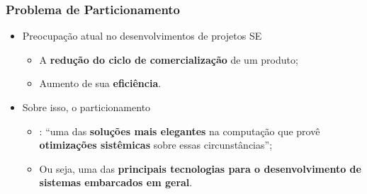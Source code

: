       \begin{frame} \vspace{-1em}
         \frametitle{Problema de Particionamento}
         \begin{itemize} \setlength{\itemsep}{1.6em}
            \item Preocupação atual no desenvolvimentos de projetos SE
            \begin{itemize} \setlength{\itemsep}{1.2em}
               \item A \textbf{redução do ciclo de comercialização} de um produto;
               \item Aumento de sua \textbf{eficiência}.
            \end{itemize}
            
            
            \item Sobre isso, o particionamento \hs
            \begin{itemize} \setlength{\itemsep}{1.2em}
               \item \cite{Hassine2017}: ``uma das \textbf{soluções mais elegantes} na computação que provê \textbf{otimizações sistêmicas} sobre essas circunstâncias'';
               \item Ou seja, uma das \textbf{principais tecnologias para o desenvolvimento de sistemas embarcados em geral}.
            \end{itemize}
            
         \end{itemize}
      \end{frame}
      
      
      
